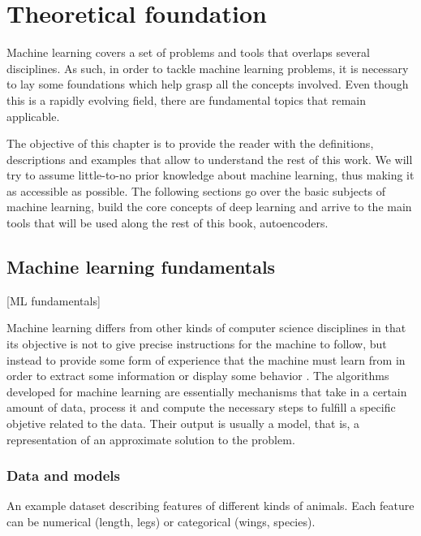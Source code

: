 \setchapterpreamble[u]{\margintoc}
\chapter{Theoretical foundation}

Machine learning covers a set of problems and tools that overlaps several disciplines. As such, in order to tackle machine learning problems, it is necessary to lay some foundations which help grasp all the concepts involved. Even though this is a rapidly evolving field, there are fundamental topics that remain applicable.

The objective of this chapter is to provide the reader with the definitions, descriptions and examples that allow to understand the rest of this work. We will try to assume little-to-no prior knowledge about machine learning, thus making it as accessible as possible. The following sections go over the basic subjects of machine learning, build the core concepts of deep learning and arrive to the main tools that will be used along the rest of this book, autoencoders.

\section{Machine learning fundamentals}[ML fundamentals]

Machine learning differs from other kinds of computer science disciplines in that its objective is not to give precise instructions for the machine to follow, but instead to provide some form of experience that the machine must learn from in order to extract some information or display some behavior . The algorithms developed for machine learning are essentially mechanisms that take in a certain amount of data, process it and compute the necessary steps to fulfill a specific objetive related to the data. Their output is usually a model, that is, a representation of an approximate solution to the problem. 
 
\subsection{Data and models}

\begin{margintable}
\caption[An example dataset describing features of different kinds of animals.]{\label{tbl:dataset}An example dataset describing features of different kinds of animals. Each feature can be numerical (length, legs) or categorical (wings, species).}\footnotesize
{}
\end{margintable}

